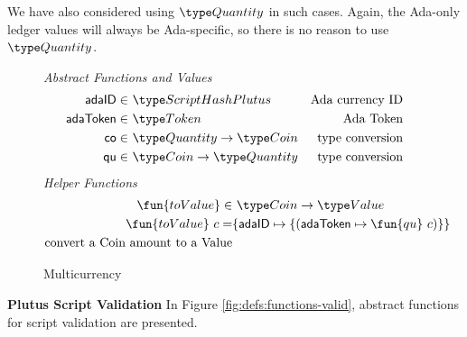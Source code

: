 We have also considered using $\Quantity$ in such cases. Again, the Ada-only
ledger values will always be Ada-specific, so there is no reason to use $\Quantity$.


\begin{figure*}[htb]
  \emph{Abstract Functions and Values}
  \begin{align*}
    \mathsf{adaID} \in& ~\ScriptHashPlutus
    & \text{Ada currency ID} \\
    \mathsf{adaToken} \in& ~\Token
    & \text{Ada Token} \\
    \mathsf{co} \in& ~\Quantity \to \Coin
    & \text{type conversion} \\
    \mathsf{qu} \in& ~\Coin \to \Quantity
    & \text{type conversion} \\
  \end{align*}
  \emph{Helper Functions}
  \begin{align*}
    \fun{toValue} \in & ~\Coin\to \Value \\
    \fun{toValue}~ c = & \{\mathsf{adaID} \mapsto \{(\mathsf{adaToken} \mapsto \fun{qu}~c)\}\} \\
    \text{convert a Coin amount to a Value} \\
  \end{align*}
  \caption{Multicurrency}
  \label{fig:defs:functions-helper}
\end{figure*}

\textbf{Plutus Script Validation}
In Figure \ref{fig:defs:functions-valid}, abstract functions for script validation
are presented.

